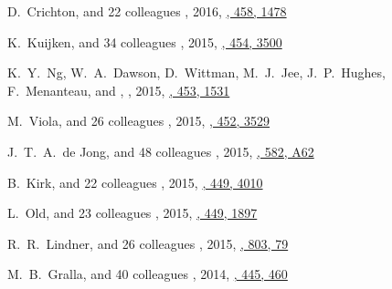 \begin{etaremune}
\item
D.~Crichton, and 22 colleagues
,
2016, \href{https://ui.adsabs.harvard.edu/abs/2016MNRAS.458.1478C}{\mnras, 458, 1478}

\item
K.~Kuijken, and 34 colleagues
,
2015, \href{https://ui.adsabs.harvard.edu/abs/2015MNRAS.454.3500K}{\mnras, 454, 3500}

\item
K.~Y.~Ng, W.~A.~Dawson, D.~Wittman, M.~J.~Jee, J.~P.~Hughes, F.~Menanteau, and \myself,
,
2015, \href{https://ui.adsabs.harvard.edu/abs/2015MNRAS.453.1531N}{\mnras, 453, 1531}

\item
M.~Viola, and 26 colleagues
,
2015, \href{https://ui.adsabs.harvard.edu/abs/2015MNRAS.452.3529V}{\mnras, 452, 3529}

\item
J.~T.~A.~de Jong, and 48 colleagues
,
2015, \href{https://ui.adsabs.harvard.edu/abs/2015A&A...582A..62D}{\aap, 582, A62}

\item
B.~Kirk, and 22 colleagues
,
2015, \href{https://ui.adsabs.harvard.edu/abs/2015MNRAS.449.4010K}{\mnras, 449, 4010}

\item
L.~Old, and 23 colleagues
,
2015, \href{https://ui.adsabs.harvard.edu/abs/2015MNRAS.449.1897O}{\mnras, 449, 1897}

\item
R.~R.~Lindner, and 26 colleagues
,
2015, \href{https://ui.adsabs.harvard.edu/abs/2015ApJ...803...79L}{\apj, 803, 79}

\item
M.~B.~Gralla, and 40 colleagues
,
2014, \href{https://ui.adsabs.harvard.edu/abs/2014MNRAS.445..460G}{\mnras, 445, 460}


\end{etaremune}
